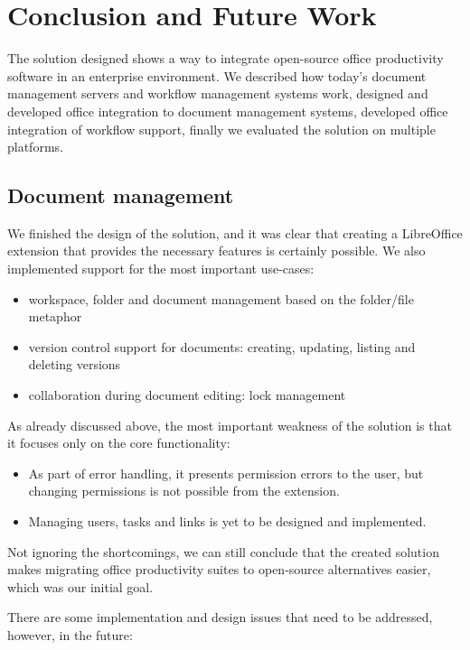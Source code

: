 \chapter{Conclusion and Future Work}

The solution designed shows a way to integrate open-source office productivity
software in an enterprise environment. We described how today's document
management servers and workflow management systems work, designed and
developed office integration to document management systems, developed
office integration of workflow support, finally we evaluated the solution on
multiple platforms.

\section{Document management}

We finished the design of the solution, and it was clear that creating a
LibreOffice extension that provides the necessary features is certainly
possible. We also implemented support for the most important use-cases:

\begin{itemize}
\item workspace, folder and document management based on the folder/file metaphor
\item version control support for documents: creating, updating, listing and deleting versions
\item collaboration during document editing: lock management
\end{itemize}

As already discussed above, the most important weakness of the solution is that
it focuses only on the core functionality:

\begin{itemize}
\item As part of error handling, it presents permission errors to the user, but
changing permissions is not possible from the extension.
\item Managing users, tasks and links is yet to be designed and implemented.
\end{itemize}

Not ignoring the shortcomings, we can still conclude that the created solution
makes migrating office productivity suites to open-source alternatives easier,
which was our initial goal.

There are some implementation and design issues that need to be addressed,
however, in the future:

